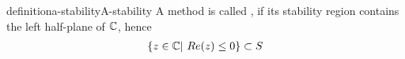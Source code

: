 \begin{Definition*}{definition}{a-stability}{A-stability}
  A method is called , if its stability region contains
  the left half-plane of $\mathbb C$, hence
  \begin{gather}
    \{ z \in \mathbb C | \ Re(z) \le 0 \} \subset S
  \end{gather}
\end{Definition*}
